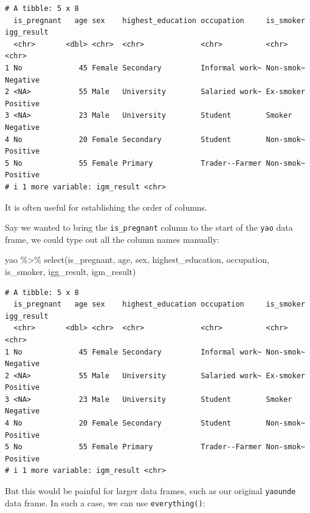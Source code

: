 \documentclass[
  letterpaper,
  DIV=11,
  numbers=noendperiod]{scrreprt}
\newenvironment{Shaded}{\begin{snugshade}}{\end{snugshade}}
\newcommand{\FunctionTok}[1]{\textcolor[rgb]{0.28,0.35,0.67}{#1}}
\newcommand{\NormalTok}[1]{\textcolor[rgb]{0.00,0.23,0.31}{#1}}
\newcommand{\SpecialCharTok}[1]{\textcolor[rgb]{0.37,0.37,0.37}{#1}}
\begin{document}
\begin{verbatim}
# A tibble: 5 x 8
  is_pregnant   age sex    highest_education occupation     is_smoker igg_result
  <chr>       <dbl> <chr>  <chr>             <chr>          <chr>     <chr>     
1 No             45 Female Secondary         Informal work~ Non-smok~ Negative  
2 <NA>           55 Male   University        Salaried work~ Ex-smoker Positive  
3 <NA>           23 Male   University        Student        Smoker    Negative  
4 No             20 Female Secondary         Student        Non-smok~ Positive  
5 No             55 Female Primary           Trader--Farmer Non-smok~ Positive  
# i 1 more variable: igm_result <chr>
\end{verbatim}

It is often useful for establishing the order of columns.

Say we wanted to bring the \texttt{is\_pregnant} column to the start of
the \texttt{yao} data frame, we could type out all the column names
manually:

\begin{Shaded}
\begin{Highlighting}[]
\NormalTok{yao }\SpecialCharTok{\%\textgreater{}\%} \FunctionTok{select}\NormalTok{(is\_pregnant, }
\NormalTok{               age, }
\NormalTok{               sex, }
\NormalTok{               highest\_education, }
\NormalTok{               occupation, }
\NormalTok{               is\_smoker, }
\NormalTok{               igg\_result, }
\NormalTok{               igm\_result)}
\end{Highlighting}
\end{Shaded}

\begin{verbatim}
# A tibble: 5 x 8
  is_pregnant   age sex    highest_education occupation     is_smoker igg_result
  <chr>       <dbl> <chr>  <chr>             <chr>          <chr>     <chr>     
1 No             45 Female Secondary         Informal work~ Non-smok~ Negative  
2 <NA>           55 Male   University        Salaried work~ Ex-smoker Positive  
3 <NA>           23 Male   University        Student        Smoker    Negative  
4 No             20 Female Secondary         Student        Non-smok~ Positive  
5 No             55 Female Primary           Trader--Farmer Non-smok~ Positive  
# i 1 more variable: igm_result <chr>
\end{verbatim}

But this would be painful for larger data frames, such as our original
\texttt{yaounde} data frame. In such a case, we can use
\texttt{everything()}:
\end{document}
